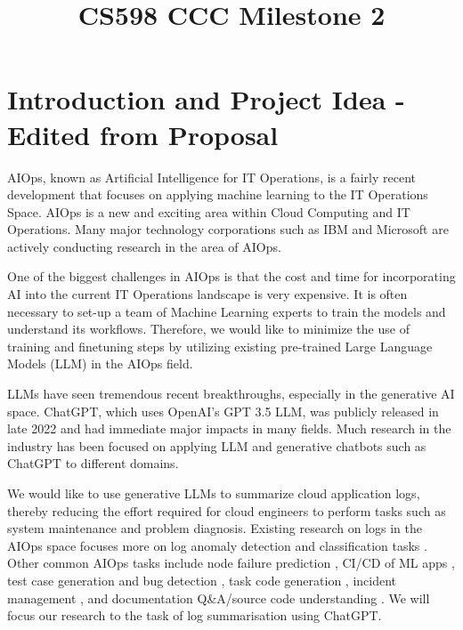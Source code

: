 \documentclass[conference]{IEEEtran}
\begin{document}
\title{CS598 CCC Milestone 2\\
}

\author{
\and
{}
\and
{}
}
\maketitle


\section{Introduction and Project Idea - Edited from Proposal}

AIOps, known as Artificial Intelligence for IT Operations, is a fairly recent development that focuses on applying machine learning to the IT Operations Space. AIOps is a new and exciting area within Cloud Computing and IT Operations. \cite{10212414, 10199929} Many major technology corporations such as IBM and Microsoft \cite{li2022an}  are actively conducting research in the area of AIOps. \cite{aiops-challenges} 

One of the biggest challenges in AIOps is that the cost and time for incorporating AI into the current IT Operations landscape is very expensive. It is often necessary to set-up a team of Machine Learning experts to train the models and understand its workflows. Therefore, we would like to minimize the use of training and finetuning steps by utilizing existing pre-trained Large Language Models (LLM) in the AIOps field.

LLMs have seen tremendous recent breakthroughs, especially in the generative AI space. ChatGPT, which uses OpenAI's GPT 3.5 LLM, was publicly released in late 2022 and had immediate major impacts in many fields. Much research in the industry has been focused on applying LLM and generative chatbots such as ChatGPT to different domains. 

We would like to use generative LLMs to summarize cloud application logs, thereby reducing the effort required for cloud engineers to perform tasks such as system maintenance and problem diagnosis. Existing research on logs in the AIOps space focuses more on log anomaly detection and classification tasks \cite{network-log-anomaly-detection}. Other common AIOps tasks include node failure prediction \cite{aiops-node-failures-alibaba}, CI/CD of ML apps \cite{mlops-ossara}, test case generation and bug detection \cite{model-checking-guided-testing}, task code generation \cite{mani2023enhancing}, incident management \cite{chen2020aiops, li2022an}, and documentation Q\&A/source code understanding \cite{source-code-understanding}. We will focus our research to the task of log summarisation using ChatGPT.
\end{document}
